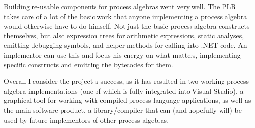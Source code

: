 	Building re-usable components for process algebras went very well. The PLR 
	takes care of a lot of the basic work that anyone implementing a process 
	algebra would otherwise have to do himself. Not just the basic process 
	algebra constructs themselves, but also expression trees for arithmetic 
	expressions, static analyses, emitting debugging symbols, and helper methods 
	for calling into .NET code. An implementor can use this and focus his energy 
	on what matters, implementing specific constructs and emitting the bytecodes 
	for them.
	
	Overall I consider the project a success, as it has resulted in two working 
	process algebra implementations (one of which is fully integrated into 
	Visual Studio), a graphical tool for working with compiled process language 
	applications, as well as the main software product, a library/compiler that 
	can (and hopefully will) be used by future implementors of other process 
	algebras.